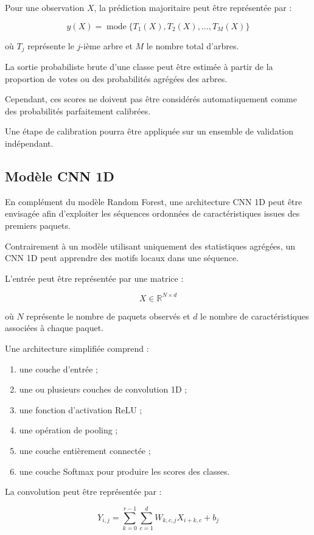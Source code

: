 Pour une observation $X$, la prédiction majoritaire
peut être représentée par :

\[
\widehat{y}(X)=
\operatorname{mode}
\{T_1(X),T_2(X),\ldots,T_M(X)\}
\]

où $T_j$ représente le $j$-ième arbre et $M$
le nombre total d'arbres.

La sortie probabiliste brute d'une classe peut être
estimée à partir de la proportion de votes ou des
probabilités agrégées des arbres.

Cependant, ces scores ne doivent pas être considérés
automatiquement comme des probabilités parfaitement
calibrées.

Une étape de calibration pourra être appliquée
sur un ensemble de validation indépendant.

\subsection{Modèle CNN 1D}

En complément du modèle Random Forest, une architecture
CNN 1D peut être envisagée afin d'exploiter les séquences
ordonnées de caractéristiques issues des premiers paquets.

Contrairement à un modèle utilisant uniquement
des statistiques agrégées, un CNN 1D peut apprendre
des motifs locaux dans une séquence.

L'entrée peut être représentée par une matrice :

\[
X\in\mathbb{R}^{N\times d}
\]

où $N$ représente le nombre de paquets observés
et $d$ le nombre de caractéristiques associées
à chaque paquet.

Une architecture simplifiée comprend :

\begin{enumerate}
    \item une couche d'entrée ;
    \item une ou plusieurs couches de convolution 1D ;
    \item une fonction d'activation ReLU ;
    \item une opération de pooling ;
    \item une couche entièrement connectée ;
    \item une couche Softmax pour produire les scores
    des classes.
\end{enumerate}

La convolution peut être représentée par :

\[
Y_{i,j}=
\sum_{k=0}^{r-1}
\sum_{c=1}^{d}
W_{k,c,j}X_{i+k,c}+b_j
\]

